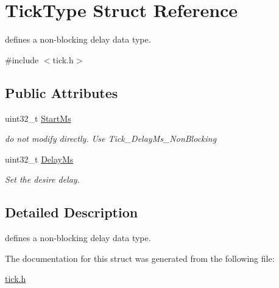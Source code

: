 \hypertarget{struct_tick_type}{\section{Tick\-Type Struct Reference}
\label{struct_tick_type}
}


defines a non-\/blocking delay data type.  




{\ttfamily \#include $<$tick.\-h$>$}

\subsection*{Public Attributes}
\begin{DoxyCompactItemize}
\item 
\hypertarget{struct_tick_type_ab5d0b8e09de5ccc9e44a9b261916bdd2}{uint32\-\_\-t \hyperlink{struct_tick_type_ab5d0b8e09de5ccc9e44a9b261916bdd2}{Start\-Ms}}\label{struct_tick_type_ab5d0b8e09de5ccc9e44a9b261916bdd2}

\begin{DoxyCompactList}\small\item\em do not modify directly. Use Tick\-\_\-\-Delay\-Ms\-\_\-\-Non\-Blocking \end{DoxyCompactList}\item 
\hypertarget{struct_tick_type_ae24ecd63a2b008c5c9a6864cbb3b30a7}{uint32\-\_\-t \hyperlink{struct_tick_type_ae24ecd63a2b008c5c9a6864cbb3b30a7}{Delay\-Ms}}\label{struct_tick_type_ae24ecd63a2b008c5c9a6864cbb3b30a7}

\begin{DoxyCompactList}\small\item\em Set the desire delay. \end{DoxyCompactList}\end{DoxyCompactItemize}


\subsection{Detailed Description}
defines a non-\/blocking delay data type. 

The documentation for this struct was generated from the following file\-:\begin{DoxyCompactItemize}
\item 
\hyperlink{tick_8h}{tick.\-h}\end{DoxyCompactItemize}

